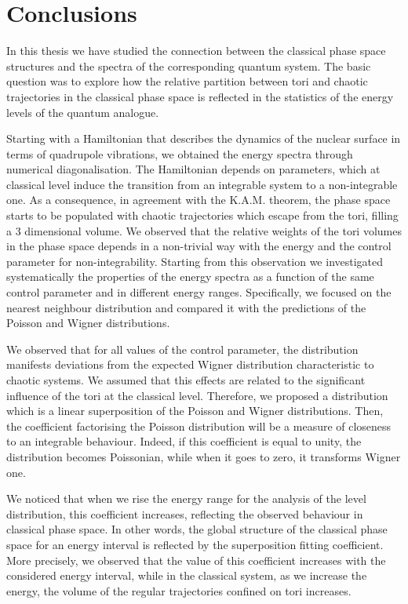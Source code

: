 \documentclass[../thesis.tex]{subfiles}
\begin{document}
\chapter{Conclusions}

In this thesis we have studied the connection between the classical phase space structures
and the spectra of the corresponding quantum system. The basic question was to
explore how the relative partition between tori and chaotic trajectories in the
classical phase space is reflected in the statistics of the energy levels of
the quantum analogue.

Starting with a Hamiltonian that describes the dynamics of the nuclear surface
in terms of quadrupole vibrations, we obtained the energy spectra through
numerical diagonalisation. The Hamiltonian depends on parameters, which at
classical level induce the transition from an integrable system to a non-integrable
one. As a consequence, in agreement with the K.A.M. theorem, the phase space
starts to be populated with chaotic trajectories which escape from the tori,
filling a 3 dimensional volume. We observed that the relative weights of the
tori volumes in the phase space depends in a non-trivial way with the energy
and the control parameter for non-integrability. Starting from this observation
we investigated systematically the properties of the energy spectra as a function
of the same control parameter and in different energy ranges. Specifically, we
focused on the nearest neighbour distribution and compared it with the predictions
of the Poisson and Wigner distributions.

We observed that for all values of the control parameter, the distribution manifests
deviations from the expected Wigner distribution characteristic to chaotic systems.
We assumed that this effects are related to the significant influence of the tori
at the classical level. Therefore, we proposed a distribution which is a linear
superposition of the Poisson and Wigner distributions. Then, the coefficient
factorising the Poisson distribution will be a measure of closeness to an
integrable behaviour. Indeed, if this coefficient is equal to unity, the distribution
becomes Poissonian, while when it goes to zero, it transforms Wigner one.

We noticed that when we rise the energy range for the analysis of the level
distribution, this coefficient increases, reflecting the observed behaviour
in classical phase space. In other words, the global structure of the classical
phase space for an energy interval is reflected by the superposition fitting coefficient.
More precisely, we observed that the value of this coefficient increases with
the considered energy interval, while in the classical system, as we
increase the energy, the volume of the regular trajectories confined on tori
increases.
\end{document}
